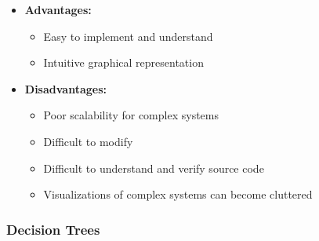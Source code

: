 \begin{itemize}
\item \textbf{Advantages:}
\begin{itemize}
    \item Easy to implement and understand
    \item Intuitive graphical representation
\end{itemize}

\item \textbf{Disadvantages:}
\begin{itemize}
    \item Poor scalability for complex systems
    \item Difficult to modify
    \item Difficult to understand and verify source code
    \item Visualizations of complex systems can become cluttered
\end{itemize}
\end{itemize}

\subsubsection*{Decision Trees}

